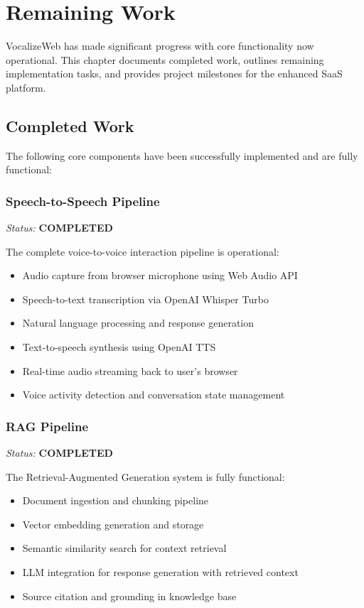 \chapter{Remaining Work}

VocalizeWeb has made significant progress with core functionality now operational. This chapter documents completed work, outlines remaining implementation tasks, and provides project milestones for the enhanced SaaS platform.

\section{Completed Work}

The following core components have been successfully implemented and are fully functional:

\subsection{Speech-to-Speech Pipeline}

\textit{Status:} \textbf{\textcolor{accentgreen}{COMPLETED}}

The complete voice-to-voice interaction pipeline is operational:
\begin{itemize}[leftmargin=*]
    \item Audio capture from browser microphone using Web Audio API
    \item Speech-to-text transcription via OpenAI Whisper Turbo
    \item Natural language processing and response generation
    \item Text-to-speech synthesis using OpenAI TTS
    \item Real-time audio streaming back to user's browser
    \item Voice activity detection and conversation state management
\end{itemize}

\subsection{RAG Pipeline}

\textit{Status:} \textbf{\textcolor{accentgreen}{COMPLETED}}

The Retrieval-Augmented Generation system is fully functional:
\begin{itemize}[leftmargin=*]
    \item Document ingestion and chunking pipeline
    \item Vector embedding generation and storage
    \item Semantic similarity search for context retrieval
    \item LLM integration for response generation with retrieved context
    \item Source citation and grounding in knowledge base
\end{itemize}


